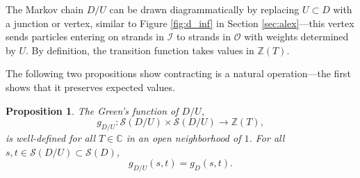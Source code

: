 \documentclass[11pt,hyp,]{nyjm}
\newcommand{\Z}{\mathbb{Z}}
\newcommand{\C}{\mathbb{C}}
\numberwithin{thm}{section}
\newtheorem{prop}[thm]{Proposition}
\theoremstyle{definition}
\theoremstyle{remark}
\begin{document}
	The Markov chain $D/U$ can be drawn diagrammatically by replacing $U \subset D$ with a junction or vertex, similar to Figure \ref{fig:d_inf} in Section \ref{sec:alex}---this vertex sends particles entering on strands in $\mathcal{I}$ to strands in $\mathcal{O}$ with weights determined by $U$. By definition, the transition function takes values in $\Z(T)$. 
	
	The following two propositions show contracting is a natural operation---the first shows that it preserves expected values.
	\begin{prop}
		\label{thm:cmc}
		The Green's function of $D/U$,
		$$
		g_{D/U} : \mathcal{S}(D/U) \times \mathcal{S}(D/U) \to \Z(T),
		$$
		 is well-defined for all $T \in \C$ in an open neighborhood of $1$. For all $s,t \in \mathcal{S}(D/U) \subset \mathcal{S}(D)$,
		 $$
		 	g_{D/U}(s,t) = g_D(s,t).
		 $$
	\end{prop}
\end{document}
